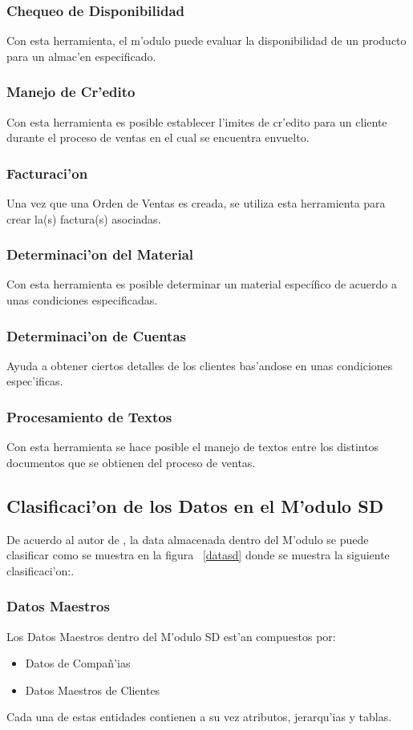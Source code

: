 \subsubsection{Chequeo de Disponibilidad}
Con esta herramienta, el m'odulo puede evaluar la disponibilidad de un producto para un almac'en especificado.
\subsubsection{Manejo de Cr'edito}
Con esta herramienta es posible establecer l'imites de cr'edito para un cliente durante el proceso de ventas en el cual se encuentra envuelto.
\subsubsection{Facturaci'on}
Una vez que una Orden de Ventas es creada, se utiliza esta herramienta para crear la(s) factura(s) asociadas.
\subsubsection{Determinaci'on del Material}
Con esta herramienta es posible determinar un material específico de acuerdo a unas condiciones especificadas.
\subsubsection{Determinaci'on de Cuentas}
Ayuda a obtener ciertos detalles de los clientes bas'andose en unas condiciones espec'ificas.
\subsubsection{Procesamiento de Textos}
Con esta herramienta se hace posible el manejo de textos entre los distintos documentos que se obtienen del proceso de ventas.


\subsection{Clasificaci'on de los Datos en el M'odulo SD}
De acuerdo al autor de \cite{SD01}, la data almacenada dentro del M'odulo se puede clasificar como se muestra en la figura ~\ref{datasd} donde se muestra la siguiente clasificaci'on:.
\subsubsection{Datos Maestros}
Los Datos Maestros dentro del M'odulo SD est'an compuestos por:
\begin{itemize}
\item Datos de Compa\~n'ias
\item Datos Maestros de Clientes
\end{itemize}
Cada una de estas entidades contienen a su vez atributos, jerarqu'ias y tablas.


